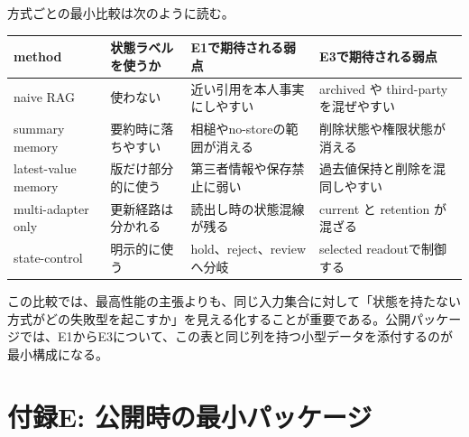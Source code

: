 \documentclass[12pt,a4paper]{article}
\begin{document}
方式ごとの最小比較は次のように読む。

{\def\LTcaptype{table} %
\begin{longtable}[]{@{}
  >{\raggedright\arraybackslash}p{}
  >{\raggedright\arraybackslash}p{}
  >{\raggedright\arraybackslash}p{}
  >{\raggedright\arraybackslash}p{}@{}}
\toprule\noalign{}
\begin{minipage}[b]{\linewidth}\raggedright
method
\end{minipage} & \begin{minipage}[b]{\linewidth}\raggedright
状態ラベルを使うか
\end{minipage} & \begin{minipage}[b]{\linewidth}\raggedright
E1で期待される弱点
\end{minipage} & \begin{minipage}[b]{\linewidth}\raggedright
E3で期待される弱点
\end{minipage} \\
\midrule\noalign{}
\endhead
\bottomrule\noalign{}
\endlastfoot
naive RAG & 使わない & 近い引用を本人事実にしやすい & archived や third-party を混ぜやすい \\
summary memory & 要約時に落ちやすい & 相槌やno-storeの範囲が消える & 削除状態や権限状態が消える \\
latest-value memory & 版だけ部分的に使う & 第三者情報や保存禁止に弱い & 過去値保持と削除を混同しやすい \\
multi-adapter only & 更新経路は分かれる & 読出し時の状態混線が残る & current と retention が混ざる \\
state-control & 明示的に使う & hold、reject、reviewへ分岐 & selected readoutで制御する \\
\end{longtable}
}

この比較では、最高性能の主張よりも、同じ入力集合に対して「状態を持たない方式がどの失敗型を起こすか」を見える化することが重要である。公開パッケージでは、E1からE3について、この表と同じ列を持つ小型データを添付するのが最小構成になる。

\section{付録E: 公開時の最小パッケージ}\label{ux4ed8ux9332e-ux516cux958bux6642ux306eux6700ux5c0fux30d1ux30c3ux30b1ux30fcux30b8}
\end{document}
